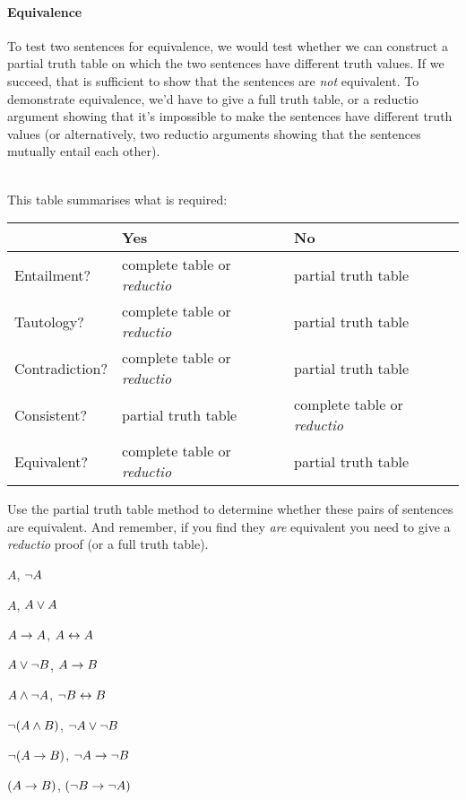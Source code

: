 \paragraph{Equivalence}
To test two sentences for equivalence, we would test whether we can construct a partial truth table on which the two sentences have different truth values.  If we succeed, that is sufficient to show that the sentences are \emph{not} equivalent.  To demonstrate equivalence, we'd have to give a full truth table, or a reductio argument showing that it's impossible to make the sentences have different truth values (or alternatively, two reductio arguments showing that the sentences mutually entail each other).




\
\\This table summarises what is required:

\begin{center}
\begin{tabular}{l l l}
 & \textbf{Yes} & \textbf{No}\\
 \hline
Entailment? & complete table or \emph{reductio} & partial truth table\\
Tautology? & complete table or \emph{reductio}  & partial truth table\\
Contradiction? & complete table or \emph{reductio}   & partial truth table\\
Consistent? & partial truth table & complete table or \emph{reductio} \\
Equivalent? & complete table or \emph{reductio} & partial truth table\\


\end{tabular}
\end{center}
\label{table.CompleteVsPartial}


\practiceproblems
\problempart
Use the partial truth table method to determine whether these pairs of sentences are equivalent.  And remember, if you find they \emph{are} equivalent you need to give a \emph{reductio} proof (or a full truth table).
\begin{earg}
\item $A$, $\neg A$ %
\item $A$, $A \vee A$ %
\item $A\rightarrow A$, $A \leftrightarrow A$ %
\item $A \vee \neg B$, $A\rightarrow B$ %
\item $A \wedge \neg A$, $\neg B \leftrightarrow B$ %
\item $\neg(A \wedge B)$, $\neg A \vee \neg B$ %
\item $\neg(A \rightarrow B)$, $\neg A \rightarrow \neg B$ %
\item $(A \rightarrow B)$, $(\neg B \rightarrow \neg A)$ %
\end{earg}

